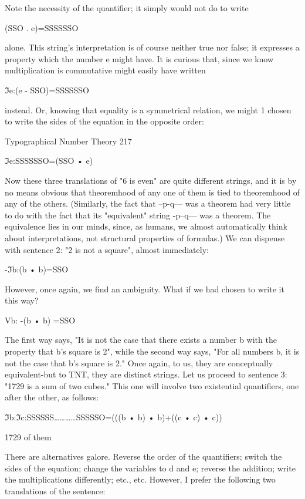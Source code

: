 Note the necessity of the quantifier; it simply would not do to write

                                   (SSO . e)=SSSSSSO

alone. This string's interpretation is of course neither true nor false; it expresses a
property which the number e might have.
        It is curious that, since we know multiplication is commutative might easily have
written

                                 ℑe:(e - SSO)=SSSSSSO

instead. Or, knowing that equality is a symmetrical relation, we might 1 chosen to write
the sides of the equation in the opposite order:


Typographical Number Theory                                                           217

                                 ℑe:SSSSSSO=(SSO • e)

Now these three translations of "6 is even" are quite different strings, and it is by no
means obvious that theoremhood of any one of them is tied to theoremhood of any of the
others. (Similarly, the fact that --p-q--- was a theorem had very little to do with the fact
that its "equivalent" string -p--q--- was a theorem. The equivalence lies in our minds,
since, as humans, we almost automatically think about interpretations, not structural
properties of formulas.)
        We can dispense with sentence 2: "2 is not a square", almost immediately:

                                     -ℑb:(b • b)=SSO

However, once again, we find an ambiguity. What if we had chosen to write it this way?

                                    Vb: -(b • b) =SSO

The first way says, "It is not the case that there exists a number b with the property that
b's square is 2", while the second way says, "For all numbers b, it is not the case that b's
square is 2." Once again, to us, they are conceptually equivalent-but to TNT, they are
distinct strings.
        Let us proceed to sentence 3: "1729 is a sum of two cubes." This one will involve
two existential quantifiers, one after the other, as follows:

              ℑb:ℑc:SSSSSS…………SSSSSO=(((b • b) • b)+((c • c) • c))

                              1729 of them

There are alternatives galore. Reverse the order of the quantifiers; switch the sides of the
equation; change the variables to d and e; reverse the addition; write the multiplications
differently; etc., etc. However, I prefer the following two translations of the sentence:

